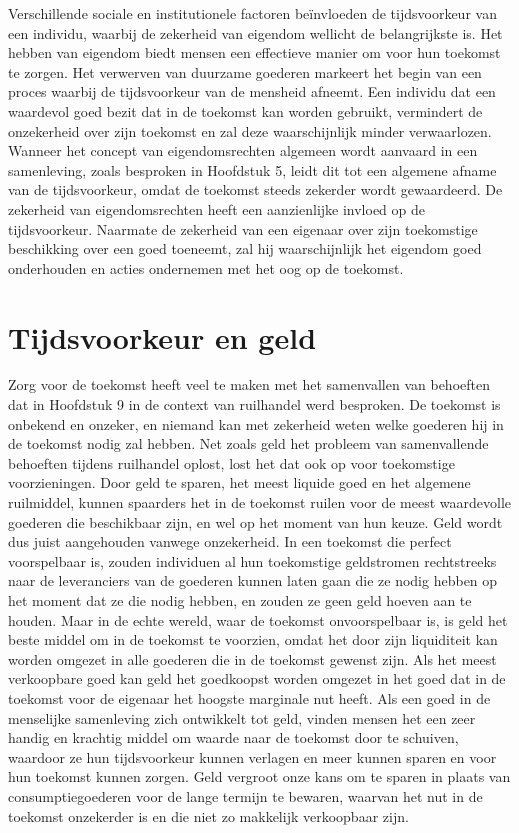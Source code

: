 Verschillende sociale en institutionele factoren beïnvloeden de tijdsvoorkeur van een individu, waarbij de zekerheid van eigendom wellicht de belangrijkste is. Het hebben van eigendom biedt mensen een effectieve manier om voor hun toekomst te zorgen. Het verwerven van duurzame goederen markeert het begin van een proces waarbij de tijdsvoorkeur van de mensheid afneemt. Een individu dat een waardevol goed bezit dat in de toekomst kan worden gebruikt, vermindert de onzekerheid over zijn toekomst en zal deze waarschijnlijk minder verwaarlozen. Wanneer het concept van eigendomsrechten algemeen wordt aanvaard in een samenleving, zoals besproken in Hoofdstuk 5, leidt dit tot een algemene afname van de tijdsvoorkeur, omdat de toekomst steeds zekerder wordt gewaardeerd. De zekerheid van eigendomsrechten heeft een aanzienlijke invloed op de tijdsvoorkeur. Naarmate de zekerheid van een eigenaar over zijn toekomstige beschikking over een goed toeneemt, zal hij waarschijnlijk het eigendom goed onderhouden en acties ondernemen met het oog op de toekomst.

\hypertarget{tijdsvoorkeur-en-geld}{%
\section{Tijdsvoorkeur en geld}\label{tijdsvoorkeur-en-geld}}

Zorg voor de toekomst heeft veel te maken met het samenvallen van behoeften dat in Hoofdstuk 9 in de context van ruilhandel werd besproken. De toekomst is onbekend en onzeker, en niemand kan met zekerheid weten welke goederen hij in de toekomst nodig zal hebben. Net zoals geld het probleem van samenvallende behoeften tijdens ruilhandel oplost, lost het dat ook op voor toekomstige voorzieningen. Door geld te sparen, het meest liquide goed en het algemene ruilmiddel, kunnen spaarders het in de toekomst ruilen voor de meest waardevolle goederen die beschikbaar zijn, en wel op het moment van hun keuze. Geld wordt dus juist aangehouden vanwege onzekerheid. In een toekomst die perfect voorspelbaar is, zouden individuen al hun toekomstige geldstromen rechtstreeks naar de leveranciers van de goederen kunnen laten gaan die ze nodig hebben op het moment dat ze die nodig hebben, en zouden ze geen geld hoeven aan te houden. Maar in de echte wereld, waar de toekomst onvoorspelbaar is, is geld het beste middel om in de toekomst te voorzien, omdat het door zijn liquiditeit kan worden omgezet in alle goederen die in de toekomst gewenst zijn. Als het meest verkoopbare goed kan geld het goedkoopst worden omgezet in het goed dat in de toekomst voor de eigenaar het hoogste marginale nut heeft. Als een goed in de menselijke samenleving zich ontwikkelt tot geld, vinden mensen het een zeer handig en krachtig middel om waarde naar de toekomst door te schuiven, waardoor ze hun tijdsvoorkeur kunnen verlagen en meer kunnen sparen en voor hun toekomst kunnen zorgen. Geld vergroot onze kans om te sparen in plaats van consumptiegoederen voor de lange termijn te bewaren, waarvan het nut in de toekomst onzekerder is en die niet zo makkelijk verkoopbaar zijn.

